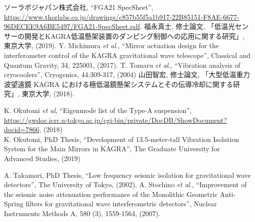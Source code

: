 \vspace{2mm}
 ソーラボジャパン株式会社, ``FGA21 SpecSheet'', \href{https://www.thorlabs.co.jp/drawings/c857b55f5a1b917-22B85151-F8AE-6677-96DECEE9A6BE5497/FGA21-SpecSheet.pdf}{https://www.thorlabs.co.jp/drawings/c857b55f5a1b917-22B85151-F8AE-6677-96DECEE9A6BE5497/FGA21-SpecSheet.pdf}.
\vspace{2mm}
 福永真士, 修士論文, 「低温光センサーの開発とKAGRA低温懸架装置のダンピング制御への応用に関する研究」, 東京大学, (2019).
\vspace{2mm}
 Y. Michimura \textit{et al}., ``Mirror actuation design for the interferometer control of the KAGRA gravitational wave telescope'', Classical and Quantum Gravity, 34, 225001, (2017). 
\vspace{2mm}
 T. Tomaru \textit{et al}., ``Vibration analysis of cryocoolers'', Cryogenics, 44:309-317, (2004)
\vspace{2mm}
 山田智宏, 修士論文, 「大型低温重力波望遠鏡 KAGRA における極低温鏡懸架システムとその伝導冷却に関する研究」, 東京大学, (2018).

\vspace{6mm}
 K. Okutomi \textit{et al}, ``Eigenmode list of the Type-A suspension'', \\\href{https://gwdoc.icrr.u-tokyo.ac.jp/cgi-bin/private/DocDB/ShowDocument?docid=7866}{https://gwdoc.icrr.u-tokyo.ac.jp/cgi-bin/private/DocDB/ShowDocument?docid=7866}, (2018)\\

\vspace{6mm}
 K. Okutomi, PhD Thesis, ``Development of 13.5-meter-tall Vibration Isolation System for the Main Mirrors in KAGRA'', The Graduate University for Advanced Studies, (2019)
\vspace{2mm}

\vspace{6mm}
 A. Takamori, PhD Thesis, ``Low frequency seismic isolation for gravitational wave detectors'', The University of Tokyo, (2002).
\vspace{2mm}
 A. Stochino \textit{et al}., ``Improvement of the seismic noise attenuation performance of the Monolithic Geometric Anti-Spring filters for gravitational wave interferometric detectors'', Nuclear Instruments Methods A, 580 (3), 1559-1564, (2007).
\vspace{2mm}